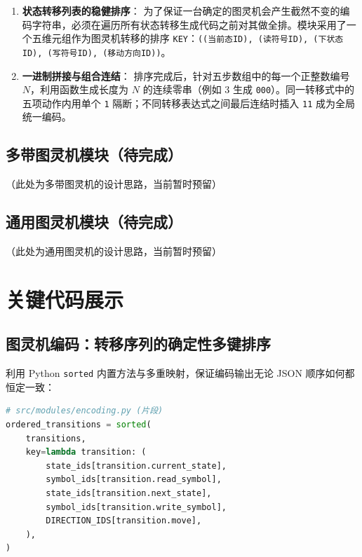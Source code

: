 \documentclass{sysucseexp}
\begin{document}
\begin{enumerate}
    \item \textbf{状态转移列表的稳健排序}：
    为了保证一台确定的图灵机会产生截然不变的编码字符串，必须在遍历所有状态转移生成代码之前对其做全排。模块采用了一个五维元组作为图灵机转移的排序 \texttt{KEY}：\texttt{((当前态ID), (读符号ID), (下状态ID), (写符号ID), (移动方向ID))}。

    \item \textbf{一进制拼接与组合连结}：
    排序完成后，针对五步数组中的每一个正整数编号 $N$，利用函数生成长度为 $N$ 的连续零串（例如 3 生成 \texttt{000}）。同一转移式中的五项动作内用单个 \texttt{1} 隔断；不同转移表达式之间最后连结时插入 \texttt{11} 成为全局统一编码。
\end{enumerate}

\subsection{多带图灵机模块（待完成）}
（此处为多带图灵机的设计思路，当前暂时预留）

\subsection{通用图灵机模块（待完成）}
（此处为通用图灵机的设计思路，当前暂时预留）

\section{关键代码展示}

\subsection{图灵机编码：转移序列的确定性多键排序}
利用 Python \texttt{sorted} 内置方法与多重映射，保证编码输出无论 JSON 顺序如何都恒定一致：
\begin{lstlisting}[language=Python]
# src/modules/encoding.py (片段)
ordered_transitions = sorted(
    transitions,
    key=lambda transition: (
        state_ids[transition.current_state],
        symbol_ids[transition.read_symbol],
        state_ids[transition.next_state],
        symbol_ids[transition.write_symbol],
        DIRECTION_IDS[transition.move],
    ),
)
\end{lstlisting}
\end{document}
